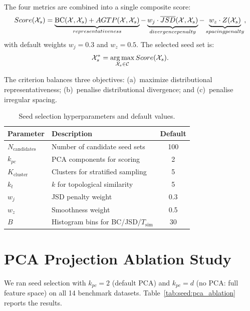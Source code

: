 The four metrics are combined into a single composite score:
\begin{equation}
  Score(\mathcal{X}_s) = \underbrace{\operatorname{BC}(\mathcal{X}, \mathcal{X}_s) + AGTP(\mathcal{X}, \mathcal{X}_s)}_{representativeness} - \underbrace{w_j \cdot \overline{JSD}(\mathcal{X}, \mathcal{X}_s)}_{divergence penalty} - \underbrace{w_z \cdot Z(\mathcal{X}_s)}_{spacing penalty},
  \label{eq:seed_score}
\end{equation}
with default weights $w_j = 0.3$ and $w_z = 0.5$. The selected seed set is:
\begin{equation}
  \mathcal{X}_s^* = \operatorname*{arg\,max}_{\mathcal{X}_s \in \mathcal{C}} Score(\mathcal{X}_s).
\end{equation}

The criterion balances three objectives: (a)~maximize distributional representativeness; (b)~penalise distributional divergence; and (c)~penalise irregular spacing.

\begin{table}[ht]
\centering
\caption{Seed selection hyperparameters and default values.}
\label{tab:seed:hyperparams}
\begin{tabular}{llc}
\toprule
\textbf{Parameter} & \textbf{Description} & \textbf{Default} \\
\midrule
$N_{\mathrm{candidates}}$ & Number of candidate seed sets & 100 \\
$k_{pc}$ & PCA components for scoring & 2 \\
$K_{\mathrm{cluster}}$ & Clusters for stratified sampling & 5 \\
$k_t$ & $k$ for topological similarity & 5 \\
$w_j$ & JSD penalty weight & 0.3 \\
$w_z$ & Smoothness weight & 0.5 \\
$B$ & Histogram bins for BC/JSD/$T_{\mathrm{sim}}$ & 30 \\
\bottomrule
\end{tabular}
\end{table}

\section{PCA Projection Ablation Study}
\label{sec:seed:pca_ablation}

We ran seed selection with $k_{pc} = 2$ (default PCA) and $k_{pc} = d$ (no PCA: full feature space) on all 14 benchmark datasets.
Table~\ref{tab:seed:pca_ablation} reports the results.

